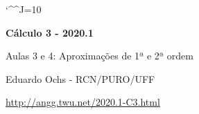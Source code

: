 \documentclass[oneside,12pt]{article}
\begin{document}
\catcode`\^^J=10




\long{}
\long{}
\long{}
\long{}
\long{}
\long{}
\long{}
\long{}
\long{}
\long{}

\long{}
\long{}

\def\frown{\ensuremath{{=}{(}}}
\def\derivs{\mathsf{derivs}}
\def\True {\mathbf{V}}
\def\False{\mathbf{F}}

\def\drafturl{http://angg.twu.net/LATEX/2020-1-C2.pdf}
\def\drafturl{http://angg.twu.net/2020.1-C2.html}
\def\draftfooter{\tiny \href{\drafturl}{\jobname{}} \ColorBrown{\shorttoday{} \hours}}


%

\thispagestyle{empty}

\begin{center}

\vspace*{1.2cm}

{\bf \Large Cálculo 3 - 2020.1}

\bsk

Aulas 3 e 4: Aproximações de 1ª e 2ª ordem

\bsk

Eduardo Ochs - RCN/PURO/UFF

\url{http://angg.twu.net/2020.1-C3.html}

\end{center}
\end{document}

